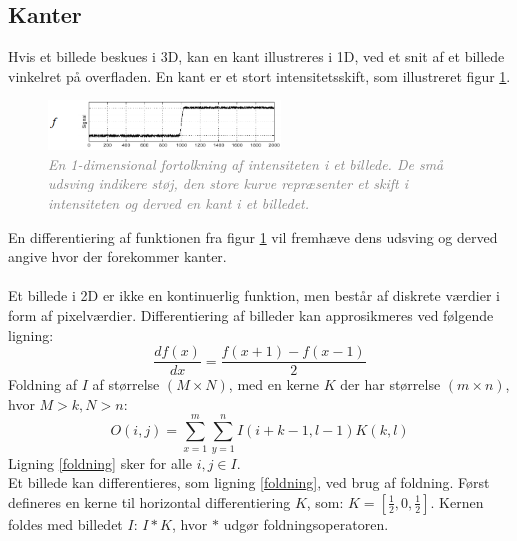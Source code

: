 \subsection{Kanter}\label{subsec:kant}
Hvis et billede beskues i 3D, kan en kant illustreres i 1D, ved et snit af et billede vinkelret på overfladen. En kant er et stort intensitetsskift, som illustreret figur \ref{fig:kant}.
\noindent
\begin{figure}[H]
    \centering
    \includegraphics[width=0.55\textwidth]{fig/7.png}
     \vspace{-1em}
    \begin{center}        
     \caption{\textcolor{gray}{\footnotesize \textit{
     En 1-dimensional fortolkning af intensiteten i et billede. De små udsving indikere støj, den store kurve repræsenter et skift i intensiteten og derved en kant i et billedet.}}}
    \label{fig:kant}
     \end{center}
       \vspace{-2.5em}
  \end{figure}
\noindent
En differentiering af funktionen fra figur \ref{fig:kant} vil fremhæve dens udsving og derved angive hvor der forekommer kanter. 
\\
\\
Et billede i 2D er ikke en kontinuerlig funktion, men består af diskrete værdier i form af pixelværdier.
Differentiering af billeder kan approsikmeres ved følgende ligning:
\begin{equation}
\dfrac{df(x)}{dx}=\dfrac{f(x+1)-f(x-1)}{2}
\label{diff}
\end{equation}
Foldning af $I$ af størrelse $(M \times N)$, med en kerne $K$ der har størrelse $(m \times n)$, hvor $M > k, N > n$:
\begin{equation}
O(i,j) = \sum\limits_{x=1}^m \sum\limits_{y=1}^n I(i+k-1,l-1)K(k,l)
\label{foldning}
\end{equation}
Ligning \eqref{foldning} sker for alle $i,j \in I$. \\
Et billede kan differentieres, som ligning \eqref{foldning}, ved brug af foldning. Først defineres en kerne til horizontal differentiering $K$, som: $K = [\frac{1}{2}, 0, \frac{1}{2}]$. Kernen foldes med billedet $I$: $I \ast K $, hvor $\ast$ udgør foldningsoperatoren.
\\
\\
